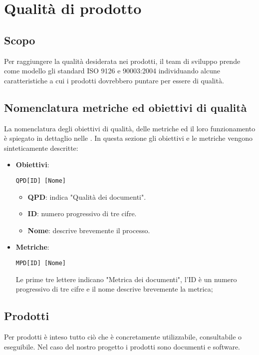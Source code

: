 \section{Qualità di prodotto}

\subsection{Scopo}
Per raggiungere la qualità desiderata nei prodotti, il team di sviluppo prende come modello gli standard ISO 9126 e 90003:2004 individuando alcune caratteristiche a cui i prodotti dovrebbero puntare per essere di qualità.

\subsection{Nomenclatura metriche ed obiettivi di qualità}
La nomenclatura degli obiettivi di qualità, delle metriche ed il loro funzionamento è spiegato in dettaglio nelle \NdP. In questa sezione gli obiettivi e le metriche vengono sinteticamente descritte:

	\begin{itemize}
		\item \textbf{Obiettivi}: 
		
		\begin{center}
			\texttt{QPD[ID] [Nome]}
		\end{center} 
		
		\begin{itemize}
			\item \textbf{QPD}: indica "Qualità dei documenti".
			\item \textbf{ID}: numero progressivo di tre cifre.
			\item \textbf{Nome}: descrive brevemente il processo.
		\end{itemize}
		
		\item \textbf{Metriche}:
		
		\begin{center}
			\texttt{MPD[ID] [Nome]}
		\end{center}
		
		Le prime tre lettere indicano "Metrica dei documenti", l'ID è un numero progressivo di tre cifre e il nome descrive brevemente la metrica;
	\end{itemize}
	


\subsection{Prodotti} %
Per prodotti è inteso tutto ciò che è concretamente utilizzabile, consultabile o eseguibile. Nel caso del nostro progetto i prodotti sono documenti e software.
